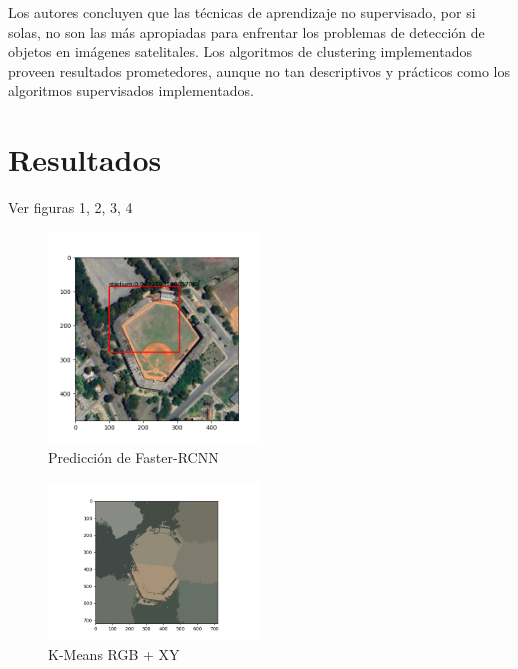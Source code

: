 \documentclass[article]{llncs}
\begin{document}
Los autores concluyen que las t\'ecnicas de aprendizaje no supervisado, por si solas, no son las m\'as apropiadas 
para enfrentar los problemas de detección de objetos en im\'agenes satelitales. Los algoritmos de clustering implementados 
proveen resultados prometedores, aunque no tan descriptivos y pr\'acticos como los algoritmos supervisados implementados.

\section{Resultados}

Ver figuras 1, 2, 3, 4


\begin{figure}[h]
  \centering
  \includegraphics[width=0.5\textwidth]{Figure_1.png}
  \caption{Predicci\'on de Faster-RCNN}
  \label{fig:Figure_1}
\end{figure}

\begin{figure}[h]
  \centering
  \includegraphics[width=0.5\textwidth]{Figure_2.png}
  \caption{K-Means RGB + XY}
  \label{fig:Figure_2}
\end{figure}
\end{document}
